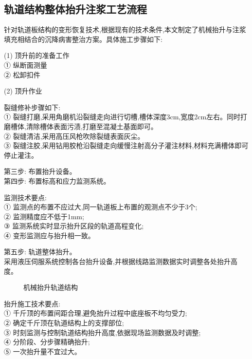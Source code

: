 \documentclass[a4paper,12pt]{ctexrep}
\begin{document}
\subsection{轨道结构整体抬升注浆工艺流程}

针对轨道板结构的变形恢复技术,根据现有的技术条件,本文制定了机械抬升与注浆填充相结合的沉降病害整治方案。具体施工步骤如下:

\noindent (1) 顶升前的准备工作 \\
① 纵断面测量 \\
② 松卸扣件

\noindent (2) 顶升作业

\noindent 裂缝修补步骤如下: \\
① 裂缝打磨,采用角磨机沿裂缝走向进行切槽,槽体深度3cm,宽度2cm左右。同时打磨槽体,清除槽体表面污渍,打磨至混凝土基面即可。 \\
② 裂缝清洁,采用高压风枪吹除裂缝表面灰尘。 \\
③ 裂缝注胶,采用钻用胶枪沿裂缝走向缓慢注射高分子灌注材料,材料充满槽体即可停止灌注。

\noindent 第三步: 布置抬升设备。 \\
\noindent 第四步: 布置标高和应力监测系统。

\noindent 监测技术要点: \\
① 监测点的布置不应过大,同一轨道板上布置的观测点不少于3个; \\
② 监测精度应不低于1mm; \\
③ 监测系统实时显示抬升区段的轨道高程变化; \\
④ 变形监测应与抬升相一致。

\noindent 第五步: 轨道整体抬升。 \\
采用液压伺服系统控制各台抬升设备,并根据线路监测数据实时调整各处抬升高度。

\begin{figure}[htbp]
    \centering
    \caption{机械抬升轨道结构}
    \label{fig:2-11}
\end{figure}

\noindent 抬升施工技术要点: \\
① 千斤顶的布置间距合理,避免抬升过程中底座板不均匀受力; \\
② 确定千斤顶在轨道结构上的支撑部位; \\
③ 时刻监测与控制轨道结构抬升高度,依据现场监测数据及时调整; \\
④ 分阶段、分步骤精确抬升; \\
⑤ 一次抬升量不宜过大。
\end{document}
